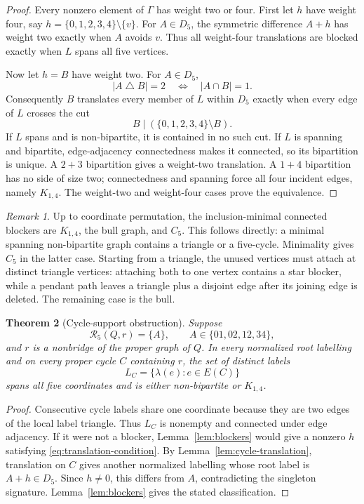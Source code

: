 \documentclass[11pt]{article}
\newtheorem{theorem}{Theorem}[section]
\theoremstyle{definition}
\theoremstyle{remark}
\newtheorem{remark}[theorem]{Remark}
\begin{document}
\begin{proof}
Every nonzero element of \(\Gamma\) has weight two or four.  First let
\(h\) have weight four, say
\(h=\{0,1,2,3,4\}\setminus\{v\}\).  For \(A\in D_5\), the symmetric
difference \(A+h\) has weight two exactly when \(A\) avoids \(v\).
Thus all weight-four translations are blocked exactly when \(L\)
spans all five vertices.

Now let \(h=B\) have weight two.  For \(A\in D_5\),
\[
 |A\mathbin\triangle B|=2
 \quad\Longleftrightarrow\quad |A\cap B|=1.
\]
Consequently \(B\) translates every member of \(L\) within \(D_5\)
exactly when every edge of \(L\) crosses the cut
\[
 B\mid(\{0,1,2,3,4\}\setminus B).                       \tag{6.6}
\]
If \(L\) spans and is non-bipartite, it is contained in no such cut.
If \(L\) is spanning and bipartite, edge-adjacency connectedness makes
it connected, so its bipartition is
unique.  A \(2+3\) bipartition gives a weight-two translation.  A
\(1+4\) bipartition has no side of size two; connectedness and spanning
force all four incident edges, namely \(K_{1,4}\).
The weight-two and weight-four cases prove the equivalence.
\end{proof}

\begin{remark}
Up to coordinate permutation, the inclusion-minimal connected blockers
are \(K_{1,4}\), the bull graph, and \(C_5\).  This follows directly:
a minimal spanning non-bipartite graph contains a triangle or a
five-cycle.  Minimality gives \(C_5\) in the latter case.  Starting
from a triangle, the unused vertices must attach at distinct triangle
vertices: attaching both to one vertex contains a star blocker, while a
pendant path leaves a triangle plus a disjoint edge after its joining
edge is deleted.  The remaining case is the bull.
\end{remark}

\begin{theorem}[Cycle-support obstruction]
\label{thm:translation-obstruction}
Suppose
\[
 \mathcal R_5(Q,r)=\{A\},\qquad
 A\in\{01,02,12,34\},
\]
and \(r\) is a nonbridge of the proper graph of \(Q\).  In every
normalized root labelling and on every proper cycle \(C\) containing
\(r\), the set of distinct labels
\[
 L_C=\{\lambda(e):e\in E(C)\}
\]
spans all five coordinates and is either non-bipartite or \(K_{1,4}\).
\end{theorem}

\begin{proof}
Consecutive cycle labels share one coordinate because they are two
edges of the local label triangle.  Thus \(L_C\) is nonempty and
connected under edge adjacency.  If it were not a blocker,
Lemma~\ref{lem:blockers} would give a nonzero \(h\) satisfying
\eqref{eq:translation-condition}.  By
Lemma~\ref{lem:cycle-translation}, translation on \(C\) gives another
normalized labelling whose root label is \(A+h\in D_5\).  Since
\(h\neq0\), this differs from \(A\), contradicting the singleton
signature.  Lemma~\ref{lem:blockers} gives the stated classification.
\end{proof}
\end{document}
